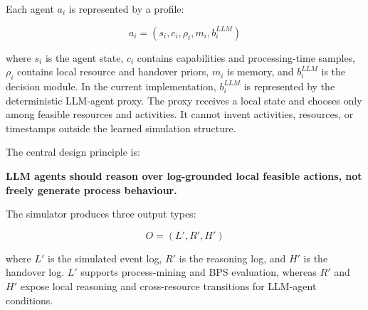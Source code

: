 Each agent \(a_i\) is represented by a profile:

\[
a_i = (s_i, c_i, \rho_i, m_i, b_i^{LLM})
\]

where \(s_i\) is the agent state, \(c_i\) contains capabilities and
processing-time samples, \(\rho_i\) contains local resource and handover
priors, \(m_i\) is memory, and \(b_i^{LLM}\) is the decision module.
In the current implementation, \(b_i^{LLM}\) is represented by the
deterministic LLM-agent proxy. The proxy receives a local state and
chooses only among feasible resources and activities. It cannot invent
activities, resources, or timestamps outside the learned simulation
structure.

The central design principle is:

\textbf{LLM agents should reason over log-grounded local feasible
actions, not freely generate process behaviour.}

The simulator produces three output types:

\[
O = (L', R', H')
\]

where \(L'\) is the simulated event log, \(R'\) is the reasoning log, and
\(H'\) is the handover log. \(L'\) supports process-mining and BPS
evaluation, whereas \(R'\) and \(H'\) expose local reasoning and
cross-resource transitions for LLM-agent conditions.
